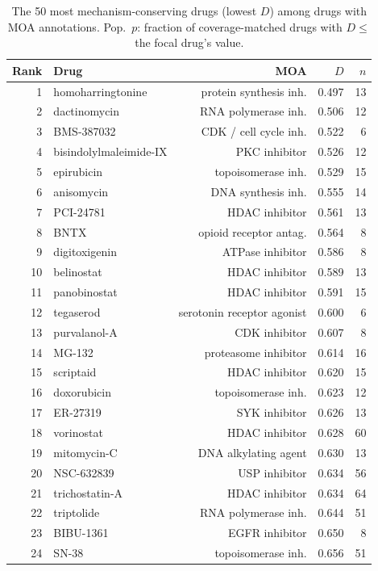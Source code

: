 \documentclass[11pt]{article}
\begin{document}
\begin{table}[h]
\centering
\caption{The 50 most mechanism-conserving drugs (lowest $D$) among drugs
with MOA annotations. Pop.\ $p$: fraction of coverage-matched drugs
with $D \leq$ the focal drug's value.}
\label{tab:top50}
\small
\begin{tabular}{rlrrr}
\toprule
Rank & Drug & MOA & $D$ & $n$ \\
\midrule
1 & homoharringtonine & protein synthesis inh. & 0.497 & 13 \\
2 & dactinomycin & RNA polymerase inh. & 0.506 & 12 \\
3 & BMS-387032 & CDK / cell cycle inh. & 0.522 & 6 \\
4 & bisindolylmaleimide-IX & PKC inhibitor & 0.526 & 12 \\
5 & epirubicin & topoisomerase inh. & 0.529 & 15 \\
6 & anisomycin & DNA synthesis inh. & 0.555 & 14 \\
7 & PCI-24781 & HDAC inhibitor & 0.561 & 13 \\
8 & BNTX & opioid receptor antag. & 0.564 & 8 \\
9 & digitoxigenin & ATPase inhibitor & 0.586 & 8 \\
10 & belinostat & HDAC inhibitor & 0.589 & 13 \\
11 & panobinostat & HDAC inhibitor & 0.591 & 15 \\
12 & tegaserod & serotonin receptor agonist & 0.600 & 6 \\
13 & purvalanol-A & CDK inhibitor & 0.607 & 8 \\
14 & MG-132 & proteasome inhibitor & 0.614 & 16 \\
15 & scriptaid & HDAC inhibitor & 0.620 & 15 \\
16 & doxorubicin & topoisomerase inh. & 0.623 & 12 \\
17 & ER-27319 & SYK inhibitor & 0.626 & 13 \\
18 & vorinostat & HDAC inhibitor & 0.628 & 60 \\
19 & mitomycin-C & DNA alkylating agent & 0.630 & 13 \\
20 & NSC-632839 & USP inhibitor & 0.634 & 56 \\
21 & trichostatin-A & HDAC inhibitor & 0.634 & 64 \\
22 & triptolide & RNA polymerase inh. & 0.644 & 51 \\
23 & BIBU-1361 & EGFR inhibitor & 0.650 & 8 \\
24 & SN-38 & topoisomerase inh. & 0.656 & 51 \\

\end{tabular}
\end{table}
\end{document}
